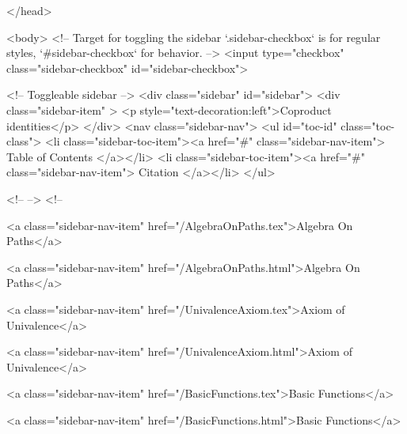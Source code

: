   
</head>




  <body>
    <!-- Target for toggling the sidebar `.sidebar-checkbox` is for regular
     styles, `#sidebar-checkbox` for behavior. -->
<input type="checkbox" class="sidebar-checkbox" id="sidebar-checkbox">

<!-- Toggleable sidebar -->
<div class="sidebar" id="sidebar">
  <div class="sidebar-item" >
    <p style="text-decoration:left">Coproduct identities</p>
  </div>
  <nav class="sidebar-nav">
    <ul id="toc-id" class="toc-class">
  <li class="sidebar-toc-item"><a href="#" class="sidebar-nav-item"> Table of Contents </a></li>
  <li class="sidebar-toc-item"><a href="#" class="sidebar-nav-item"> Citation </a></li>
</ul>


    <!--  -->
    <!-- 
      
    
      
    
      
    
      
        
      
    
      
        
          <a class="sidebar-nav-item" href="/AlgebraOnPaths.tex">Algebra On Paths</a>
        
      
    
      
        
          <a class="sidebar-nav-item" href="/AlgebraOnPaths.html">Algebra On Paths</a>
        
      
    
      
        
          <a class="sidebar-nav-item" href="/UnivalenceAxiom.tex">Axiom of Univalence</a>
        
      
    
      
        
          <a class="sidebar-nav-item" href="/UnivalenceAxiom.html">Axiom of Univalence</a>
        
      
    
      
        
          <a class="sidebar-nav-item" href="/BasicFunctions.tex">Basic Functions</a>
        
      
    
      
        
          <a class="sidebar-nav-item" href="/BasicFunctions.html">Basic Functions</a>
        
      
    
      
        
